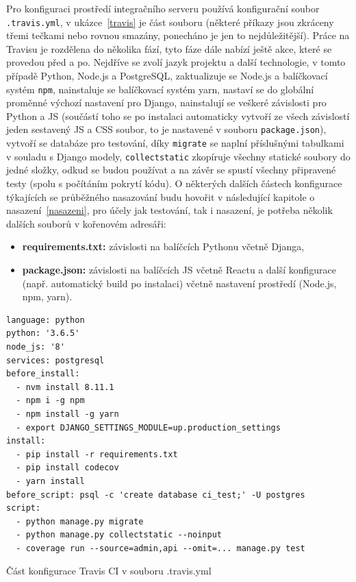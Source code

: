     Pro konfiguraci prostředí integračního serveru používá konfigurační soubor \verb|.travis.yml|, v ukázce~\ref{travis} je část souboru (některé příkazy jsou zkráceny třemi tečkami nebo rovnou smazány, ponecháno je jen to nejdůležitější). Práce na Travisu je rozdělena do několika fází, tyto fáze dále nabízí ještě akce, které se provedou před a po. Nejdříve se zvolí jazyk projektu a další technologie, v tomto případě Python, Node.js a PostgreSQL, zaktualizuje se Node.js a balíčkovací systém \verb|npm|, nainstaluje se balíčkovací systém yarn, nastaví se do globální proměnné výchozí nastavení pro Django, nainstalují se veškeré závislosti pro Python a JS (součástí toho se po instalaci automaticky vytvoří ze všech závislostí jeden sestavený JS a CSS soubor, to je nastavené v souboru \verb|package.json|), vytvoří se databáze pro testování, díky \verb|migrate| se naplní příslušnými tabulkami v souladu s Django modely, \verb|collectstatic| zkopíruje všechny statické soubory do jedné složky, odkud se budou používat a na závěr se spustí všechny připravené testy (spolu s počítáním pokrytí kódu). O některých dalších částech konfigurace týkajících se průběžného nasazování budu hovořit v následující kapitole o nasazení~\ref{nasazeni}, pro účely jak testování, tak i nasazení, je potřeba několik dalších souborů v kořenovém adresáři:
    \begin{itemize}
        \item \textbf{requirements.txt:} závislosti na balíčcích Pythonu včetně Djanga,
        \item \textbf{package.json:} závislosti na balíčcích JS včetně Reactu a další konfigurace (např. automatický build po instalaci) včetně nastavení prostředí (Node.js, npm, yarn).
    \end{itemize}
    
    \begin{listing}[ht]
    	\begin{verbatim}
language: python
python: '3.6.5'
node_js: '8'
services: postgresql
before_install:
  - nvm install 8.11.1
  - npm i -g npm
  - npm install -g yarn
  - export DJANGO_SETTINGS_MODULE=up.production_settings
install:
  - pip install -r requirements.txt
  - pip install codecov
  - yarn install
before_script: psql -c 'create database ci_test;' -U postgres
script:
  - python manage.py migrate
  - python manage.py collectstatic --noinput
  - coverage run --source=admin,api --omit=... manage.py test
    	\end{verbatim}
    	\caption{Část konfigurace Travis CI v souboru .travis.yml}\label{travis}
    \end{listing}
    
